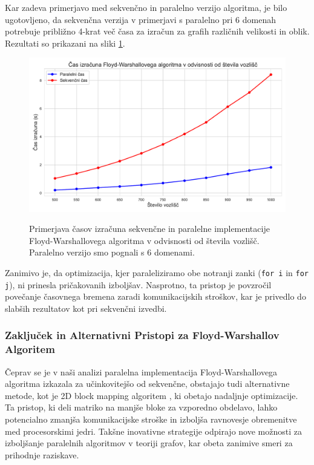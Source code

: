 \documentclass[mat1, tisk]{fmfdelo}
\begin{document}
Kar zadeva primerjavo med sekvenčno in paralelno verzijo algoritma, je bilo ugotovljeno, da sekvenčna verzija v primerjavi s paralelno pri 6 domenah
potrebuje približno 4-krat več časa za izračun za grafih različnih velikosti in oblik. Rezultati so prikazani na sliki \ref{fig:floyd_v_odvisnosti_od_velikosti_grafa}.

\begin{figure}[h!]
  \centering
  \caption{Primerjava časov izračuna sekvenčne in paralelne implementacije Floyd-Warshallovega algoritma v odvisnosti od števila vozlišč. Paralelno verzijo smo pognali s 6 domenami.}
  \includegraphics[width=15cm]{slike/floyd_v_odvisnosti_od_velikosti_grafa.pdf}
  \label{fig:floyd_v_odvisnosti_od_velikosti_grafa}
\end{figure}

Zanimivo je, da optimizacija, kjer paraleliziramo obe notranji zanki (\texttt{for i} in \texttt{for j}), ni prinesla pričakovanih izboljšav.
Nasprotno, ta pristop je povzročil povečanje časovnega bremena zaradi komunikacijskih stroškov, kar je privedlo do slabših rezultatov
kot pri sekvenčni izvedbi.

\subsubsection{Zaključek in Alternativni Pristopi za Floyd-Warshallov Algoritem}

Čeprav se je v naši analizi paralelna implementacija Floyd-Warshallovega algoritma izkazala za učinkovitejšo od sekvenčne, obstajajo tudi
alternativne metode, kot je 2D block mapping algoritem \cite{parallel_floyd_warshall}, ki obetajo nadaljnje optimizacije. Ta pristop, ki deli
matriko na manjše bloke za vzporedno obdelavo, lahko potencialno zmanjša komunikacijske stroške in izboljša ravnovesje obremenitve med
procesorskimi jedri. Takšne inovativne strategije odpirajo nove možnosti za izboljšanje paralelnih algoritmov v teoriji grafov,
kar obeta zanimive smeri za prihodnje raziskave.
\end{document}
